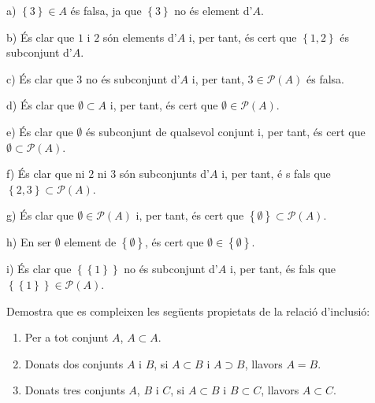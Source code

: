 \begin{solucio}
a) $\left\{ 3\right\} \in A$ \'{e}s falsa, ja que $\left\{ 3\right\} $ no
\'{e}s element d'$A$.

b) \'{E}s clar que $1$ i $2$ s\'{o}n elements d'$A$ i, per tant, \'{e}s cert
que $\left\{ 1,2\right\} $ \'{e}s subconjunt d'$A$.

c) \'{E}s clar que $3$ no \'{e}s subconjunt d'$A$ i, per tant, $3\in
\mathcal{P}(A)$ \'{e}s falsa.

d) \'{E}s clar que $\emptyset \subset A$ i, per tant, \'{e}s cert que $%
\emptyset \in \mathcal{P}(A)$.

e) \'{E}s clar que $\emptyset $ \'{e}s subconjunt de qualsevol conjunt i,
per tant, \'{e}s cert que $\emptyset \subset \mathcal{P}(A)$.

f) \'{E}s clar que ni $2$ ni $3$ s\'{o}n subconjunts d'$A$ i, per tant, \'{e}%
s fals que $\left\{ 2,3\right\} \subset \mathcal{P}(A)$.

g) \'{E}s clar que $\emptyset \in \mathcal{P}(A)$ i, per tant, \'{e}s cert
que $\left\{ \emptyset \right\} \subset \mathcal{P}(A)$.

h) En ser $\emptyset $ element de $\left\{ \emptyset \right\} $, \'{e}s cert
que $\emptyset \in \left\{ \emptyset \right\} $.

i) \'{E}s clar que $\left\{ \left\{ 1\right\} \right\} $ no \'{e}s
subconjunt d'$A$ i, per tant, \'{e}s fals que $\left\{ \left\{ 1\right\}
\right\} \in \mathcal{P}(A)$.
\end{solucio}

\begin{exer}
Demostra que es compleixen les seg\"{u}ents propietats de la relaci\'{o}
d'inclusi\'{o}:

\begin{enumerate}
\item Per a tot conjunt $A$, $A\subset A$.

\item Donats dos conjunts $A$ i $B$, si $A\subset B$ i $A\supset B$, llavors
$A=B$.

\item Donats tres conjunts $A$, $B$ i $C$, si $A\subset B$ i $B\subset C$,
llavors $A\subset C$.
\end{enumerate}
\end{exer}


